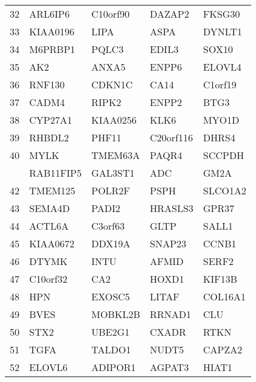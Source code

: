 \documentclass[letterpaper,12pt]{article}
\numberwithin{equation}{appendix}
\begin{document}
{{\begin{longtable}{lllll}
32&ARL6IP6&C10orf90&DAZAP2&FKSG30\tabularnewline
33&KIAA0196&LIPA&ASPA&DYNLT1\tabularnewline
34&M6PRBP1&PQLC3&EDIL3&SOX10\tabularnewline
35&AK2&ANXA5&ENPP6&ELOVL4\tabularnewline
36&RNF130&CDKN1C&CA14&C1orf19\tabularnewline
37&CADM4&RIPK2&ENPP2&BTG3\tabularnewline
38&CYP27A1&KIAA0256&KLK6&MYO1D\tabularnewline
39&RHBDL2&PHF11&C20orf116&DHRS4\tabularnewline
40&MYLK&TMEM63A&PAQR4&SCCPDH\tabularnewline
\newpage
41&RAB11FIP5&GAL3ST1&ADC&GM2A\tabularnewline
42&TMEM125&POLR2F&PSPH&SLCO1A2\tabularnewline
43&SEMA4D&PADI2&HRASLS3&GPR37\tabularnewline
44&ACTL6A&C3orf63&GLTP&SALL1\tabularnewline
45&KIAA0672&DDX19A&SNAP23&CCNB1\tabularnewline
46&DTYMK&INTU&AFMID&SERF2\tabularnewline
47&C10orf32&CA2&HOXD1&KIF13B\tabularnewline
48&HPN&EXOSC5&LITAF&COL16A1\tabularnewline
49&BVES&MOBKL2B&RRNAD1&CLU\tabularnewline
50&STX2&UBE2G1&CXADR&RTKN\tabularnewline
51&TGFA&TALDO1&NUDT5&CAPZA2\tabularnewline
52&ELOVL6&ADIPOR1&AGPAT3&HIAT1\tabularnewline
\end{longtable}

}}
\end{document}

